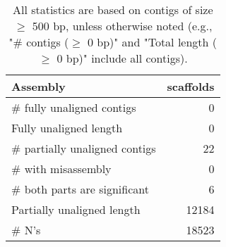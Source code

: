 \documentclass[12pt,a4paper]{article}
\begin{document}
\begin{table}[ht]
\begin{center}
\caption{All statistics are based on contigs of size $\geq$ 500 bp, unless otherwise noted (e.g., "\# contigs ($\geq$ 0 bp)" and "Total length ($\geq$ 0 bp)" include all contigs).}
\begin{tabular}{|l*{1}{|r}|}
\hline
Assembly & scaffolds \\ \hline
\# fully unaligned contigs & 0 \\ \hline
Fully unaligned length & 0 \\ \hline
\# partially unaligned contigs & 22 \\ \hline
\hspace{5mm}\# with misassembly & 0 \\ \hline
\hspace{5mm}\# both parts are significant & 6 \\ \hline
Partially unaligned length & 12184 \\ \hline
\# N's & 18523 \\ \hline
\end{tabular}
\end{center}
\end{table}
\end{document}

